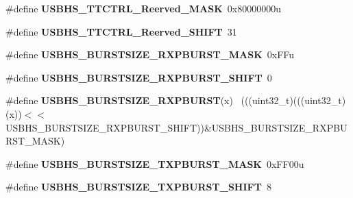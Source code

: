\begin{DoxyCompactItemize}
\item 
\hypertarget{group___u_s_b_h_s___register___masks_gaae08536ff74cf11d4a383f0b843ae361}{}\#define {\bfseries U\+S\+B\+H\+S\+\_\+\+T\+T\+C\+T\+R\+L\+\_\+\+Reerved\+\_\+\+M\+A\+S\+K}~0x80000000u\label{group___u_s_b_h_s___register___masks_gaae08536ff74cf11d4a383f0b843ae361}

\item 
\hypertarget{group___u_s_b_h_s___register___masks_ga7da154c2b7532f7bd1699da9fe292c26}{}\#define {\bfseries U\+S\+B\+H\+S\+\_\+\+T\+T\+C\+T\+R\+L\+\_\+\+Reerved\+\_\+\+S\+H\+I\+F\+T}~31\label{group___u_s_b_h_s___register___masks_ga7da154c2b7532f7bd1699da9fe292c26}

\item 
\hypertarget{group___u_s_b_h_s___register___masks_ga2246ed7f9f790dac7bb6bbf28233c3a6}{}\#define {\bfseries U\+S\+B\+H\+S\+\_\+\+B\+U\+R\+S\+T\+S\+I\+Z\+E\+\_\+\+R\+X\+P\+B\+U\+R\+S\+T\+\_\+\+M\+A\+S\+K}~0x\+F\+Fu\label{group___u_s_b_h_s___register___masks_ga2246ed7f9f790dac7bb6bbf28233c3a6}

\item 
\hypertarget{group___u_s_b_h_s___register___masks_ga187f503b7a2b8f0515b0c8c543795847}{}\#define {\bfseries U\+S\+B\+H\+S\+\_\+\+B\+U\+R\+S\+T\+S\+I\+Z\+E\+\_\+\+R\+X\+P\+B\+U\+R\+S\+T\+\_\+\+S\+H\+I\+F\+T}~0\label{group___u_s_b_h_s___register___masks_ga187f503b7a2b8f0515b0c8c543795847}

\item 
\hypertarget{group___u_s_b_h_s___register___masks_ga2d10e8119fb62e19f2dbd8a35d063b74}{}\#define {\bfseries U\+S\+B\+H\+S\+\_\+\+B\+U\+R\+S\+T\+S\+I\+Z\+E\+\_\+\+R\+X\+P\+B\+U\+R\+S\+T}(x)                        ~(((uint32\+\_\+t)(((uint32\+\_\+t)(x))$<$$<$U\+S\+B\+H\+S\+\_\+\+B\+U\+R\+S\+T\+S\+I\+Z\+E\+\_\+\+R\+X\+P\+B\+U\+R\+S\+T\+\_\+\+S\+H\+I\+F\+T))\&U\+S\+B\+H\+S\+\_\+\+B\+U\+R\+S\+T\+S\+I\+Z\+E\+\_\+\+R\+X\+P\+B\+U\+R\+S\+T\+\_\+\+M\+A\+S\+K)\label{group___u_s_b_h_s___register___masks_ga2d10e8119fb62e19f2dbd8a35d063b74}

\item 
\hypertarget{group___u_s_b_h_s___register___masks_ga5c4def7e110e90df47f810006b468bef}{}\#define {\bfseries U\+S\+B\+H\+S\+\_\+\+B\+U\+R\+S\+T\+S\+I\+Z\+E\+\_\+\+T\+X\+P\+B\+U\+R\+S\+T\+\_\+\+M\+A\+S\+K}~0x\+F\+F00u\label{group___u_s_b_h_s___register___masks_ga5c4def7e110e90df47f810006b468bef}

\item 
\hypertarget{group___u_s_b_h_s___register___masks_ga9ec85f5e936a4fe1824070bc67b3ce80}{}\#define {\bfseries U\+S\+B\+H\+S\+\_\+\+B\+U\+R\+S\+T\+S\+I\+Z\+E\+\_\+\+T\+X\+P\+B\+U\+R\+S\+T\+\_\+\+S\+H\+I\+F\+T}~8\label{group___u_s_b_h_s___register___masks_ga9ec85f5e936a4fe1824070bc67b3ce80}


\end{DoxyCompactItemize}
